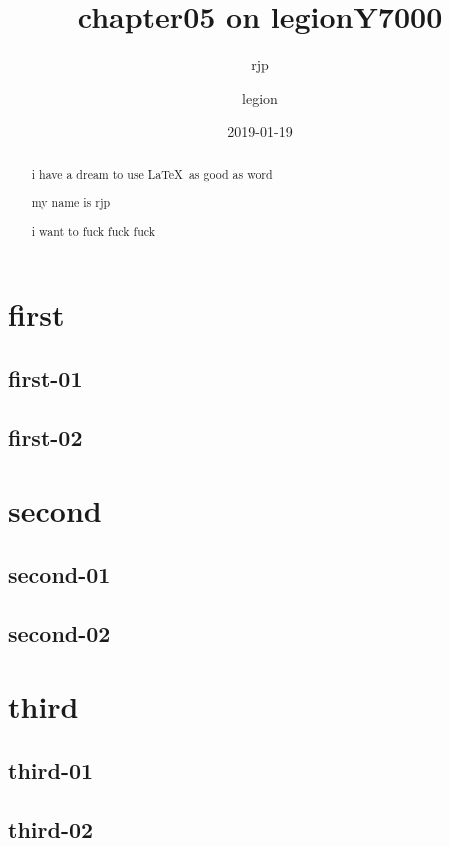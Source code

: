\documentclass[a4paper, UTF8]{article}
\begin{document}
\title{chapter05 on legionY7000}
\author{rjp \and legion}
\date{2019-01-19}
\maketitle
\begin{abstract}
    i have a dream to use \LaTeX\ as good as word

    my name is rjp

    i want to fuck fuck fuck 
\end{abstract}
\newpage
{}

\tableofcontents
\newpage

\section{first}
\subsection{first-01}
\newpage
\subsection{first-02}
\newpage

\section{second}
\subsection{second-01}
\newpage
\subsection{second-02}
\newpage

\section{third}
\subsection{third-01}
\newpage
\subsection{third-02}

\end{document}
